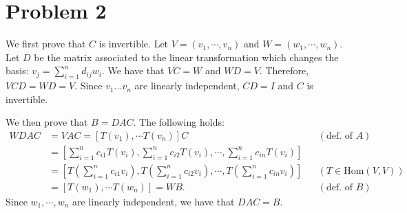 \documentclass[11pt]{article}
\theoremstyle{plain}
\theoremstyle{definition}
\theoremstyle{remark}
\def\-#1{\mathrm{#1}} %
\begin{document}
\section*{Problem 2}
We first prove that $C$ is invertible.
Let $V = (v_1,\cdots,v_n)$ and $W = (w_1,\cdots,w_n)$.
Let $D$ be the matrix associated to the linear transformation which changes the basis: $v_j = \sum_{i=1}^n d_{ij}w_i$.
We have that $VC = W$ and $WD = V$.
Therefore, $VCD = WD = V$.
Since $v_1\ldots v_n$ are linearly independent, $CD = I$ and $C$ is invertible.

We then prove that $B=DAC$.
The following holds:
\begin{align*}
    WDAC &= VAC = [T(v_1),\cdots T(v_n)]C &&(\text{def. of }A)
    \\&= [\sum_{i=1}^n c_{i1} T(v_i), \sum_{i=1}^n c_{i2} T(v_i) ,\cdots , \sum_{i=1}^n c_{in} T(v_i)]
    \\&= [T(\sum_{i=1}^n c_{i1} v_i), T(\sum_{i=1}^n c_{i2}v_i) ,\cdots , T(\sum_{i=1}^n c_{in}v_i)] &&(T\in \-{Hom}(V,V))
    \\&= [T(w_1),\cdots T(w_n)] = WB.  &&(\text{def. of }B)
\end{align*}
Since $w_1,\cdots,w_n$ are linearly independent, we have that $DAC = B$.
\end{document}
